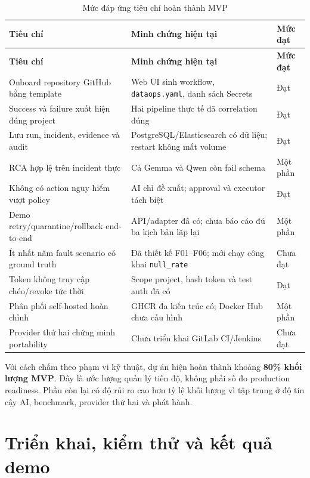 \documentclass[12pt,a4paper,oneside]{report}
\newcommand{\code}[1]{\texttt{#1}}
\begin{document}
\begin{longtable}{L{7.5cm} L{4.5cm} L{2.0cm}}
\caption{Mức đáp ứng tiêu chí hoàn thành MVP}\label{tab:dod}\\
\toprule
\textbf{Tiêu chí} & \textbf{Minh chứng hiện tại} & \textbf{Mức đạt} \\
\midrule
\endfirsthead
\toprule
\textbf{Tiêu chí} & \textbf{Minh chứng hiện tại} & \textbf{Mức đạt} \\
\midrule
\endhead
Onboard repository GitHub bằng template & Web UI sinh workflow, \code{dataops.yaml}, danh sách Secrets & Đạt \\
Success và failure xuất hiện đúng project & Hai pipeline thực tế đã correlation đúng & Đạt \\
Lưu run, incident, evidence và audit & PostgreSQL/Elasticsearch có dữ liệu; restart không mất volume & Đạt \\
RCA hợp lệ trên incident thực & Cả Gemma và Qwen còn fail schema & Một phần \\
Không có action nguy hiểm vượt policy & AI chỉ đề xuất; approval và executor tách biệt & Đạt \\
Demo retry/quarantine/rollback end-to-end & API/adapter đã có; chưa báo cáo đủ ba kịch bản lặp lại & Một phần \\
Ít nhất năm fault scenario có ground truth & Đã thiết kế F01--F06; mới chạy công khai \code{null\_rate} & Chưa đạt \\
Token không truy cập chéo/revoke tức thời & Scope project, hash token và test auth đã có & Đạt \\
Phân phối self-hosted hoàn chỉnh & GHCR đa kiến trúc có; Docker Hub chưa cấu hình & Một phần \\
Provider thứ hai chứng minh portability & Chưa triển khai GitLab CI/Jenkins & Chưa đạt \\
\bottomrule
\end{longtable}

Với cách chấm theo phạm vi kỹ thuật, dự án hiện hoàn thành khoảng \textbf{80\% khối lượng MVP}.
Đây là ước lượng quản lý tiến độ, không phải số đo production readiness. Phần còn lại có độ rủi ro
cao hơn tỷ lệ khối lượng vì tập trung ở độ tin cậy AI, benchmark, provider thứ hai và phát hành.

\chapter{Triển khai, kiểm thử và kết quả demo}
\end{document}
